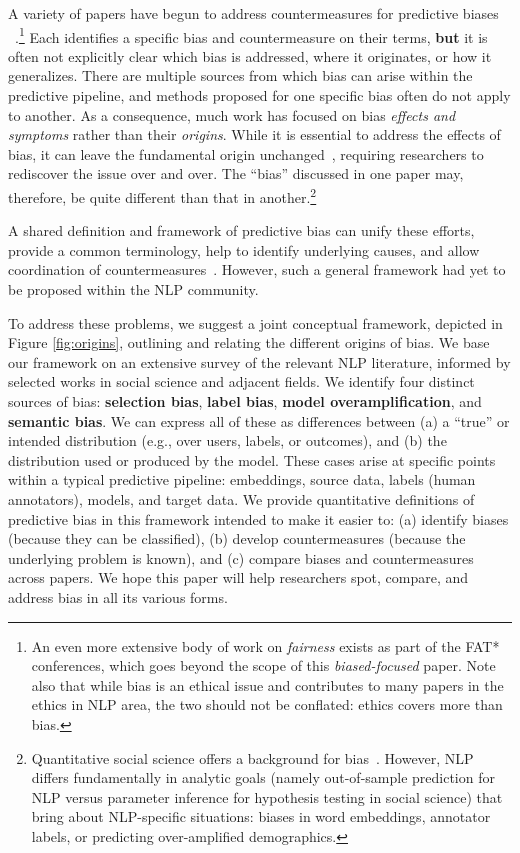 \documentclass[11pt,a4paper]{article}
\begin{document}
A variety of papers have begun to address countermeasures for predictive biases ~\cite{li2018towards,elazar2018adversarial,coavoux2018privacy}.\footnote{An even more extensive body of work on \textit{fairness} exists as part of the FAT* conferences, which goes beyond the scope of this \textit{biased-focused} paper. Note also that while bias is an ethical issue and contributes to many papers in the ethics in NLP area, the two should not be conflated: ethics covers more than bias.} 
Each identifies a specific bias and countermeasure on their terms, \textbf{but} it is often not explicitly clear which bias is addressed, where it originates, or how it generalizes. 
There are multiple sources from which bias can arise within the predictive pipeline, and methods proposed for one specific bias often do not apply to another. 
As a consequence, much work has focused on bias \textit{effects and symptoms} rather than their \textit{origins}.
While it is essential to address the effects of bias, it can leave the fundamental origin unchanged~\cite{gonen-goldberg-2019-lipstick-pig}, requiring researchers to rediscover the issue over and over.
The ``bias'' discussed in one paper may, therefore, be quite different than that in another.\footnote{Quantitative social science offers a background for  bias~\cite{berk1983introduction}. However, NLP differs fundamentally in analytic goals (namely out-of-sample prediction for NLP versus parameter inference for hypothesis testing in social science) that bring about NLP-specific situations: biases in word embeddings, annotator labels, or predicting over-amplified demographics.}  

A shared definition and framework of predictive bias can unify these efforts, provide a common terminology, help to identify underlying causes, and allow coordination of countermeasures~\cite{sun-etal-2019-mitigating}. 
However, such a general framework had yet to be proposed within the NLP community.

To address these problems, we suggest a joint conceptual framework, depicted in Figure \ref{fig:origins}, outlining and relating the different origins of bias. We base our framework on an extensive survey of the relevant NLP literature, informed by selected works in social science and adjacent fields.
We identify four distinct sources of bias: \textbf{selection bias}, \textbf{label bias}, \textbf{model overamplification}, and \textbf{semantic bias}. We can express all of these as differences between (a) a ``true'' or intended distribution (e.g., over users, labels, or outcomes), and (b) the distribution used or produced by the model. These cases arise at specific points within a typical predictive pipeline: embeddings, source data, labels (human annotators), models, and target data. 
We provide quantitative definitions of predictive bias in this framework intended to make it easier to: (a) identify biases (because they can be classified), (b) develop countermeasures (because the underlying problem is known), and (c) compare biases and countermeasures across papers. 
We hope this paper will help researchers spot, compare, and address bias in all its various forms.
\end{document}
